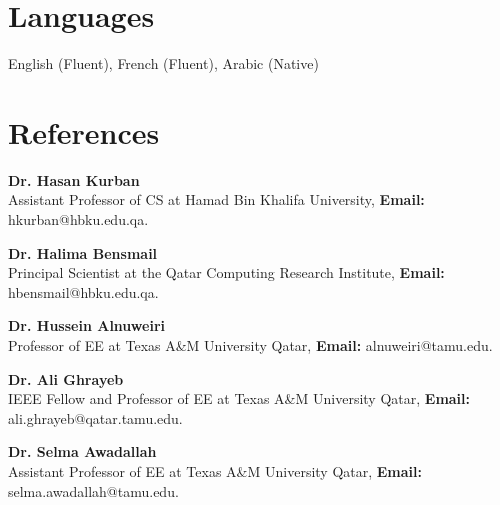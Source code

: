 \documentclass[resmargin, 10pt]{res} %
\begin{document}
\begin{resume}
\section{Languages}

English (Fluent), French (Fluent), Arabic (Native) 

\vspace{-3pt}
\section{References}

{\bf Dr. Hasan Kurban} \\
Assistant Professor of CS at Hamad Bin Khalifa University, {\bf Email:} hkurban@hbku.edu.qa.

\vspace{-6pt}
{\bf Dr. Halima Bensmail} \\
Principal Scientist at the Qatar Computing Research Institute, {\bf Email:} hbensmail@hbku.edu.qa.

\vspace{-6pt}
{\bf Dr. Hussein Alnuweiri} \\
Professor of EE at Texas A\&M University Qatar, {\bf Email:} alnuweiri@tamu.edu.

\vspace{-6pt}
{\bf Dr. Ali Ghrayeb} \\
IEEE Fellow and Professor of EE at Texas A\&M University Qatar, {\bf Email:} ali.ghrayeb@qatar.tamu.edu.

\vspace{-6pt}
{\bf Dr. Selma Awadallah} \\
Assistant Professor of EE at Texas A\&M University Qatar, {\bf Email:} selma.awadallah@tamu.edu.



\end{resume}
\end{document}
